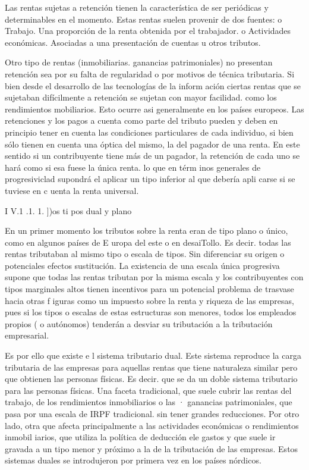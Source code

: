 \documentclass[10pt,a4paper]{article}
\begin{document}
Las rentas sujetas a retención tienen la característica de ser periódicas y determinables en el momento. Estas rentas suelen provenir de dos fuentes:
o Trabajo. Una proporción de la renta obtenida por el trabajador.
o Actividades económicas. Asociadas a una presentación de cuentas u otros tributos.

Otro tipo de rentas (inmobiliarias. ganancias patrimoniales) no presentan retención sea por su falta de regularidad o por motivos de técnica tributaria. Si bien desde el desarrollo de las tecnologías de la inform ación ciertas rentas que se sujetaban difícilmente a retención se sujetan con mayor facilidad. como los rendimientos mobiliarios. Esto ocurre asi generalmente en los países europeos. Las retenciones y los pagos a cuenta como parte del tributo pueden y deben en principio tener en cuenta las condiciones particulares de cada individuo, si bien sólo tienen en cuenta una óptica del mismo, la del pagador de una renta. En este sentido si un contribuyente tiene más de un pagador, la retención de cada uno se hará como si esa fuese la única renta. lo que en térm inos generales de progresiviclad supondrá el aplicar un tipo inferior al que debería apli carse si se tuviese en c uenta la renta universal.


I V.1 .1. 1. ])os ti pos dual y plano

En un primer momento los tributos sobre la renta eran de tipo plano o único, como en algunos países de E uropa del este o en desaiTollo. Es decir. todas las rentas tributaban al mismo tipo o escala de tipos. Sin diferenciar su origen o potenciales efectos sustitución. La existencia de una escala única progresiva supone que todas las rentas tributan por la misma escala y los contribuyentes con tipos marginales altos tienen incentivos para un potencial problema de trasvase hacia otras f iguras como un impuesto sobre la renta y riqueza de las empresas, pues si los tipos o escalas de estas estructuras son menores, todos los empleados propios ( o autónomos) tenderán a desviar su tributación a la tributación empresarial.

Es por ello que existe e l sistema tributario dual. Este sistema reproduce la carga tributaria de las empresas para aquellas rentas que tiene naturaleza similar pero que obtienen las personas físicas. Es decir. que se da un doble sistema tributario para las personas físicas. Una faceta tradicional, que suele cubrir las rentas del trabajo, de los rendimientos inmobiliarios o las · ganancias patrimoniales, que pasa por una escala de IRPF tradicional. sin tener grandes reducciones. Por otro lado, otra que afecta principalmente a las actividades económicas o rendimientos inmobil iarios, que utiliza la política de deducción ele gastos y que suele ir gravada a un tipo menor y próximo a la de la tributación de las empresas. Estos sistemas duales se introdujeron por primera vez en los países nórdicos.
\end{document}
